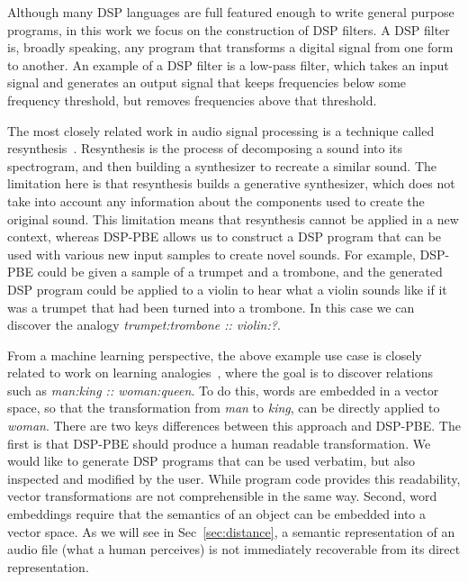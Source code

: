 Although many DSP languages are full featured enough to write general purpose programs, in this work we focus on the construction of DSP filters.
A DSP filter is, broadly speaking, any program that transforms a digital signal from one form to another.
An example of a DSP filter is a low-pass filter, which takes an input signal and generates an output signal that keeps frequencies below some frequency threshold, but removes frequencies above that threshold.

The most closely related work in audio signal processing is a technique called resynthesis~\cite{masri1996improved}.
Resynthesis is the process of decomposing a sound into its spectrogram, and then building a synthesizer to recreate a similar sound.
The limitation here is that resynthesis builds a generative synthesizer, which does not take into account any information about the components used to create the original sound.
This limitation means that resynthesis cannot be applied in a new context, whereas DSP-PBE allows us to construct a DSP program that can be used with various new input samples to create novel sounds. 
For example, DSP-PBE could be given a sample of a trumpet and a trombone, and the generated DSP program could be applied to a violin to hear what a violin sounds like if it was a trumpet that had been turned into a trombone.
In this case we can discover the analogy \textit{trumpet:trombone :: violin:?}.

From a machine learning perspective, the above example use case is closely related to work on learning analogies~\cite{mikolov2013distributed}, where the goal is to discover relations such as \textit{man:king :: woman:queen}.
To do this, words are embedded in a vector space, so that the transformation from \textit{man} to \textit{king}, can be directly applied to \textit{woman}.
There are two keys differences between this approach and DSP-PBE.
The first is that DSP-PBE should produce a human readable transformation.
We would like to generate DSP programs that can be used verbatim, but also inspected and modified by the user.
While program code provides this readability, vector transformations are not comprehensible in the same way. 
Second, word embeddings require that the semantics of an object can be embedded into a vector space. 
As we will see in Sec~\ref{sec:distance}, a semantic representation of an audio file (what a human perceives) is not immediately recoverable from its direct representation.
